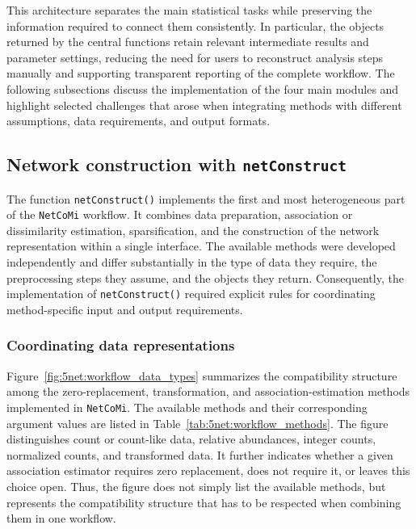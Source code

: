 This architecture separates the main statistical tasks while preserving the information required to connect them consistently. In particular, the objects returned by the central functions retain relevant intermediate results and parameter settings, reducing the need for users to reconstruct analysis steps manually and supporting transparent reporting of the complete workflow. The following subsections discuss the implementation of the four main modules and highlight selected challenges that arose when integrating methods with different assumptions, data requirements, and output formats.

\subsection{Network construction with \texttt{netConstruct}}
\label{sec:5net:workflow_implementation:netconstruct}

The function \texttt{netConstruct()} implements the first and most heterogeneous part of the \texttt{NetCoMi} workflow. It combines data preparation, association or dissimilarity estimation, sparsification, and the construction of the network representation within a single interface. The available methods were developed independently and differ substantially in the type of data they require, the preprocessing steps they assume, and the objects they return. Consequently, the implementation of \texttt{netConstruct()} required explicit rules for coordinating method-specific input and output requirements.

\subsubsection*{Coordinating data representations}

Figure~\ref{fig:5net:workflow_data_types} summarizes the compatibility structure among the zero-replacement, transformation, and association-estimation methods implemented in \texttt{NetCoMi}. The available methods and their corresponding argument values are listed in Table~\ref{tab:5net:workflow_methods}. The figure distinguishes count or count-like data, relative abundances, integer counts, normalized counts, and transformed data. It further indicates whether a given association estimator requires zero replacement, does not require it, or leaves this choice open. Thus, the figure does not simply list the available methods, but represents the compatibility structure that has to be respected when combining them in one workflow.

